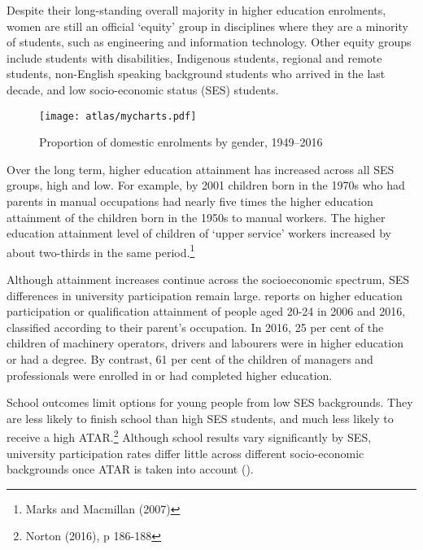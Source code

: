 \documentclass{grattan}
\begin{document}
Despite their long-standing overall majority in higher education enrolments, women are still an official `equity' group in disciplines where they are a minority of students, such as engineering and information technology. Other equity groups include students with disabilities, Indigenous students, regional and remote students, non-English speaking background students who arrived in the last decade, and low socio-economic status (SES) students.


    \begin{figure} %
    \caption{Proportion of domestic enrolments by gender, 1949--2016}\label{fig:proportion-of-domestic-enrolments-by-gender-19492016}
    \texttt{[image: atlas/mycharts.pdf]}
    \end{figure}

Over the long term, higher education attainment has increased across all SES groups, high and low. For example, by 2001 children born in the 1970s who had parents in manual occupations had nearly five times the higher education attainment of the children born in the 1950s to manual workers. The higher education attainment level of children of `upper service' workers increased by about two-thirds in the same period.\footnote{Marks and Macmillan (2007)}

Although attainment increases continue across the socioeconomic spectrum, SES differences in university participation remain large.  reports on higher education participation or qualification attainment of people aged 20-24 in 2006 and 2016, classified according to their parent's occupation. In 2016, 25 per cent of the children of machinery operators, drivers and labourers were in higher education or had a degree. By contrast, 61 per cent of the children of managers and professionals were enrolled in or had completed higher education.

School outcomes limit options for young people from low SES backgrounds. They are less likely to finish school than high SES students, and much less likely to receive a high ATAR.\footnote{Norton (2016), p 186-188} Although school results vary significantly by SES, university participation rates differ little across different socio-economic backgrounds once ATAR is taken into account ().
\end{document}
